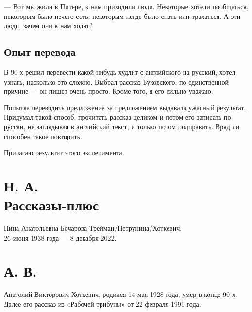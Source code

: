 \documentclass{book}
\begin{document}
--- Вот мы жили в Питере, к нам приходили люди.
Некоторые хотели пообщаться, некоторым было нечего есть, некоторым негде было спать или трахаться.
А эти люди, зачем они к нам ходят?

\backmatter

\chapter*{Опыт перевода}

В 90-х решил перевести какой-нибудь худлит с английского на русский, хотел узнать, насколько это сложно.
Выбрал рассказ Буковского, по единственной причине --- он пишет очень просто.
Кроме того, я его сильно уважаю.

Попытка переводить предложение за предложением выдавала ужасный результат.
Придумал такой способ: прочитать рассказ целиком и потом его записать по-русски, не заглядывая в английский текст, и только потом подправить.
Вряд ли способен такое повторить.

Прилагаю результат этого эксперимента.



\part*{Н. А.\\
Рассказы-плюс}
Нина Анатольевна Бочарова-Трейман/Петрунина/Хоткевич,\\
26 июня 1938 года --- 8 декабря 2022.




\part*{А. В.\\
}

Анатолий Викторович Хоткевич, родился 14 мая 1928 года, умер в конце 90-х.
Далее его рассказ из «Рабочей трибуны» от 22 февраля 1991 года.



\tableofcontents
\end{document}
